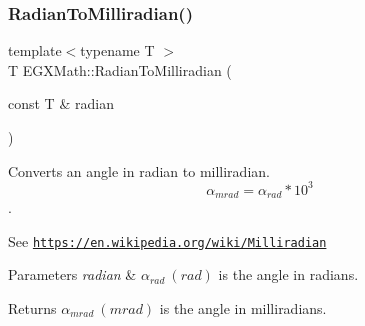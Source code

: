\subsubsection{\texorpdfstring{Radian\+To\+Milliradian()}{RadianToMilliradian()}}
{\footnotesize\ttfamily template$<$typename T $>$ \\
T E\+G\+X\+Math\+::\+Radian\+To\+Milliradian (\begin{DoxyParamCaption}\item[{const T \&}]{radian }\end{DoxyParamCaption})}



Converts an angle in radian to milliradian. \[\alpha_{mrad}=\alpha_{rad}*10^3\]. 

See \href{https://en.wikipedia.org/wiki/Milliradian}{\tt https\+://en.\+wikipedia.\+org/wiki/\+Milliradian} 
\begin{DoxyParams}{Parameters}
{\em radian} & $\alpha_{rad}\ (rad)$ is the angle in radians. \\
\hline
\end{DoxyParams}
\begin{DoxyReturn}{Returns}
$\alpha_{mrad}\ (mrad)$ is the angle in milliradians. 
\end{DoxyReturn}
